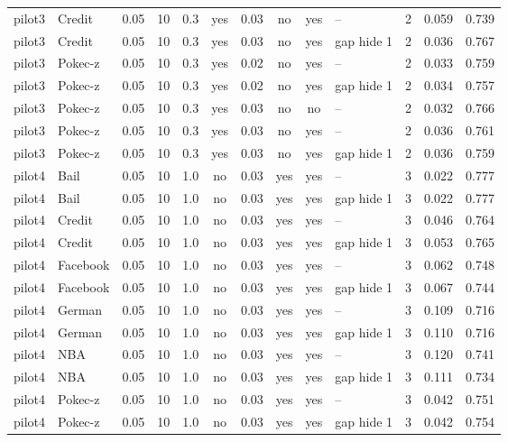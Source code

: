 \begin{table}[p]
\begin{adjustbox}{max width=\textwidth}
\begin{tabular}{llccccccclccc}
pilot3 & Credit & 0.05 & 10 & 0.3 & yes & 0.03 & no & yes & -- & 2 & 0.059 & 0.739 \\
pilot3 & Credit & 0.05 & 10 & 0.3 & yes & 0.03 & no & yes & gap hide 1 & 2 & 0.036 & 0.767 \\
pilot3 & Pokec-z & 0.05 & 10 & 0.3 & yes & 0.02 & no & yes & -- & 2 & 0.033 & 0.759 \\
pilot3 & Pokec-z & 0.05 & 10 & 0.3 & yes & 0.02 & no & yes & gap hide 1 & 2 & 0.034 & 0.757 \\
pilot3 & Pokec-z & 0.05 & 10 & 0.3 & yes & 0.03 & no & no & -- & 2 & 0.032 & 0.766 \\
pilot3 & Pokec-z & 0.05 & 10 & 0.3 & yes & 0.03 & no & yes & -- & 2 & 0.036 & 0.761 \\
pilot3 & Pokec-z & 0.05 & 10 & 0.3 & yes & 0.03 & no & yes & gap hide 1 & 2 & 0.036 & 0.759 \\
pilot4 & Bail & 0.05 & 10 & 1.0 & no & 0.03 & yes & yes & -- & 3 & 0.022 & 0.777 \\
pilot4 & Bail & 0.05 & 10 & 1.0 & no & 0.03 & yes & yes & gap hide 1 & 3 & 0.022 & 0.777 \\
pilot4 & Credit & 0.05 & 10 & 1.0 & no & 0.03 & yes & yes & -- & 3 & 0.046 & 0.764 \\
pilot4 & Credit & 0.05 & 10 & 1.0 & no & 0.03 & yes & yes & gap hide 1 & 3 & 0.053 & 0.765 \\
pilot4 & Facebook & 0.05 & 10 & 1.0 & no & 0.03 & yes & yes & -- & 3 & 0.062 & 0.748 \\
pilot4 & Facebook & 0.05 & 10 & 1.0 & no & 0.03 & yes & yes & gap hide 1 & 3 & 0.067 & 0.744 \\
pilot4 & German & 0.05 & 10 & 1.0 & no & 0.03 & yes & yes & -- & 3 & 0.109 & 0.716 \\
pilot4 & German & 0.05 & 10 & 1.0 & no & 0.03 & yes & yes & gap hide 1 & 3 & 0.110 & 0.716 \\
pilot4 & NBA & 0.05 & 10 & 1.0 & no & 0.03 & yes & yes & -- & 3 & 0.120 & 0.741 \\
pilot4 & NBA & 0.05 & 10 & 1.0 & no & 0.03 & yes & yes & gap hide 1 & 3 & 0.111 & 0.734 \\
pilot4 & Pokec-z & 0.05 & 10 & 1.0 & no & 0.03 & yes & yes & -- & 3 & 0.042 & 0.751 \\
pilot4 & Pokec-z & 0.05 & 10 & 1.0 & no & 0.03 & yes & yes & gap hide 1 & 3 & 0.042 & 0.754 \\
\bottomrule
\end{tabular}
\end{adjustbox}
\end{table}

